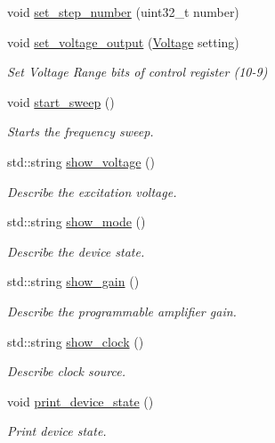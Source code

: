 \begin{DoxyCompactItemize}
void \mbox{\hyperlink{struct_a_d5933_a81d597ac151fbe62080ecd28d8b87ebb}{set\+\_\+step\+\_\+number}} (uint32\+\_\+t number)
\item 
void \mbox{\hyperlink{struct_a_d5933_a2857afff783cc4eb459864ddff7bd151}{set\+\_\+voltage\+\_\+output}} (\mbox{\hyperlink{ad5933_8hpp_ad0295b163fa728ece7beda3d933127de}{Voltage}} setting)
\begin{DoxyCompactList}\small\item\em Set Voltage Range bits of control register (10-\/9) \end{DoxyCompactList}\item 
void \mbox{\hyperlink{struct_a_d5933_ad9a52b2c0be2b9b638203329d404e3af}{start\+\_\+sweep}} ()
\begin{DoxyCompactList}\small\item\em Starts the frequency sweep. \end{DoxyCompactList}\item 
std\+::string \mbox{\hyperlink{struct_a_d5933_a8db9035d025b0813d1f1271c94e000be}{show\+\_\+voltage}} ()
\begin{DoxyCompactList}\small\item\em Describe the excitation voltage. \end{DoxyCompactList}\item 
std\+::string \mbox{\hyperlink{struct_a_d5933_a2b05a8fa5cab640c277ae0ece4f6d7cd}{show\+\_\+mode}} ()
\begin{DoxyCompactList}\small\item\em Describe the device state. \end{DoxyCompactList}\item 
std\+::string \mbox{\hyperlink{struct_a_d5933_a2cbd4c63481455a0fe83a4b5413bd292}{show\+\_\+gain}} ()
\begin{DoxyCompactList}\small\item\em Describe the programmable amplifier gain. \end{DoxyCompactList}\item 
std\+::string \mbox{\hyperlink{struct_a_d5933_afbb03853efb175d6e60ebccefb13af50}{show\+\_\+clock}} ()
\begin{DoxyCompactList}\small\item\em Describe clock source. \end{DoxyCompactList}\item 
void \mbox{\hyperlink{struct_a_d5933_ac180b673bdde8afa6d368a70886ecf8a}{print\+\_\+device\+\_\+state}} ()
\begin{DoxyCompactList}\small\item\em Print device state. \end{DoxyCompactList}\end{DoxyCompactItemize}
